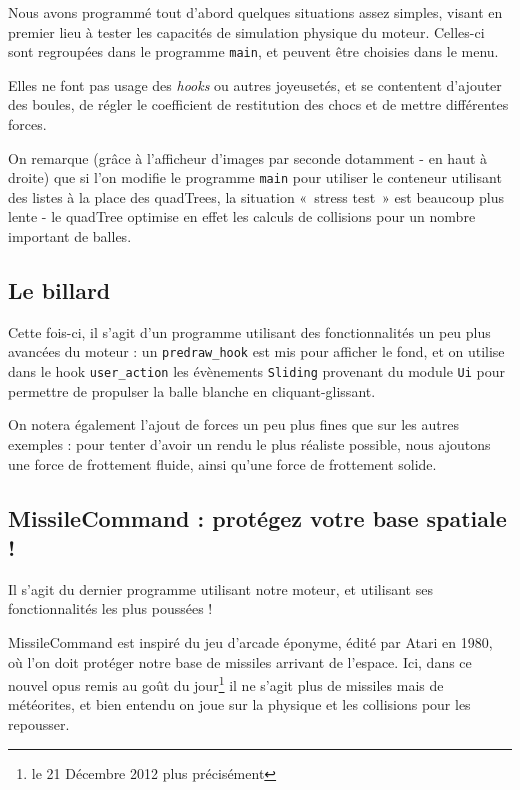 \documentclass[a4paper]{scrartcl}
\begin{document}
Nous avons programmé tout d'abord quelques situations assez simples,
visant en premier lieu à tester les capacités de simulation physique
du moteur. Celles-ci sont regroupées dans le programme \texttt{main},
et peuvent être choisies dans le menu.

Elles ne font pas usage des \emph{hooks} ou autres joyeusetés, et se
contentent d'ajouter des boules, de régler le coefficient de
restitution des chocs et de mettre différentes forces.

On remarque (grâce à l'afficheur d'images par seconde dotamment - en
haut à droite) que si l'on modifie le programme \texttt{main} pour
utiliser le conteneur utilisant des listes à la place des quadTrees,
la situation «~stress test~» est beaucoup plus lente - le quadTree
optimise en effet les calculs de collisions pour un nombre important
de balles.

\subsection{Le billard}

Cette fois-ci, il s'agit d'un programme utilisant des fonctionnalités
un peu plus avancées du moteur : un \texttt{predraw\_hook} est mis
pour afficher le fond, et on utilise dans le hook
\texttt{user\_action} les évènements \texttt{Sliding} provenant du
module \texttt{Ui} pour permettre de propulser la balle blanche en
cliquant-glissant.

On notera également l'ajout de forces un peu plus fines que sur les
autres exemples : pour tenter d'avoir un rendu le plus réaliste
possible, nous ajoutons une force de frottement fluide, ainsi qu'une
force de frottement solide.

\subsection{MissileCommand : protégez votre base spatiale !}

Il s'agit du dernier programme utilisant notre moteur, et utilisant
ses fonctionnalités les plus poussées !

MissileCommand est inspiré du jeu d'arcade éponyme, édité par Atari en
1980, où l'on doit protéger notre base de missiles arrivant de
l'espace. Ici, dans ce nouvel opus remis au goût du jour\footnote{le
  21 Décembre 2012 plus précisément} il ne s'agit plus de missiles
mais de météorites, et bien entendu on joue sur la physique et les
collisions pour les repousser.
\end{document}
